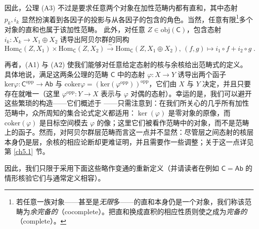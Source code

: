 因此，公理 (A3) 不过是要求任意两个对象在加性范畴内都有直和，其中态射 $p_k, i_k$ 显然扮演着到各因子的投影与从各因子的包含的角色。当然，任意有限\footnote{若任意一族对象——甚至是\textit{无限}多——的直和本身仍是一个对象，我们称该范畴为\textit{余完备的}（cocomplete）。把直和换成直积的相应性质则使之成为\textit{完备的}（complete）。}多个对象的直和也属于该加性范畴。
此外，对任意 $Z\in\text{obj}(\mathsf{C})$，包含态射 $i_k:X_k\rightarrow X_1\oplus X_2$ 诱导出阿贝尔群的同构
\[
\text{Hom}_\mathsf{C}(Z,X_1)\times\text{Hom}_\mathsf{C}(Z,X_2)\xrightarrow{\sim}\text{Hom}_\mathsf{C}(Z,X_1\oplus X_2),\,(f,g)\mapsto i_1\circ f + i_2\circ g\;.
\]


再者，(A1) 与 (A2) 使我们能够对任意给定态射的核与余核给出范畴式的定义。具体地说，满足这两条公理的范畴 $\mathsf{C}$ 中的态射 $\varphi:X\rightarrow Y$ 诱导出两个函子 $\text{ker}\varphi:\mathsf{C}^\text{opp}\rightarrow\mathsf{Ab}$ 与 $\text{coker}\varphi=(\text{ker}(\varphi^\text{opp}))^\text{opp}$，它们由 $X$ 与 $Y$ 决定，并且只要存在就唯一（这里 $\varphi^\text{opp}:Y\rightarrow X$ 表示与 $\varphi$ 对偶的态射）。幸运的是，我们可以避开这些繁琐的构造——它们概述于 \cite[subsections II.5.6--II.5.8]{[GM03]}——只需注意到：在我们所关心的几乎所有加性范畴中，众所周知的集合论式定义都适用：$\ker(\varphi)$ 是零对象的原像，而 $\text{coker}(\varphi)$ 是目标空间模去 $\varphi$ 的像；这里它们被看作范畴中的对象，而不是范畴上的函子。然而，对阿贝尔群层范畴而言这一点并不显然：尽管层之间态射的核层本身仍是层，余核的相应论断却更难证明，并且需要作一些调整；关于这一点详见第 \ref{ch5.1} 节。

因此，我们只限于采用下面这些略作变通的重新定义（并请读者在例如 $\mathsf{C}=\mathsf{Ab}$ 的情形核验它们与通常定义相容）。

